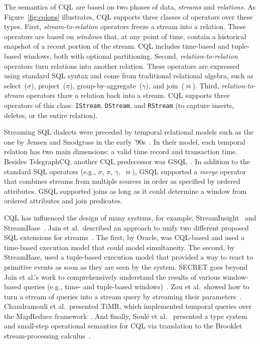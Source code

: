 The semantics of CQL are
based on two phases of data, \emph{streams} and \emph{relations}.
As Figure~\ref{fig:cqlops} illustrates, CQL
supports three classes of operators over these types. First,
\emph{stream-to-relation} operators freeze a stream into a relation.
These operators are based on
\emph{windows} that, at any point of time, contain a
historical snapshot of a recent portion of the stream. CQL includes
time-based and tuple-based windows, both with optional
partitioning. Second, \emph{relation-to-relation} operators
turn relations into another relation. These operators are expressed
using standard SQL syntax and come from traditional relational
algebra, such as select~($\sigma$), project~($\pi$),
group-by-aggregate~($\gamma$), and join~($\bowtie$).
Third, \emph{rela\-tion-to-stream} operators thaw a relation
back into a stream. CQL supports three operators of this class:
\texttt{IStream}, \texttt{DStream}, and \texttt{RStream} (to capture inserts, deletes, or the entire
relation).

Streaming SQL dialects were preceded by temporal relational models
such as the one by Jensen and Snodgrass in the early
'90s~\cite{jensen1994temporal}. In their model, each temporal relation
has two main dimensions: a valid time record and transaction time.
Besides TelegraphCQ, another CQL predecessor was
\textsf{GSQL}~\cite{cranor_et_al_2003}.  In addition to the standard SQL
operators (e.g., $\sigma$, $\pi$, $\gamma$,~$\bowtie$), GSQL supported
a \emph{merge} operator that combines streams from multiple sources in
order as specified by ordered attributes.  GSQL supported joins as long
as it could determine a window from ordered attributes and join predicates.

CQL has influenced the design of many systems, for example,
\textsf{StreamInsight}~\cite{ali_et_al_2009} and
\textsf{StreamBase}~\cite{seyfer_tibbetts_mishkin_2011}.
%
Jain et al.\ described an approach to unify two different proposed SQL
extensions for streams~\cite{jain_et_al_2008}. The first, by
Oracle, was CQL-based and used a time-based execution model that
could model simultaneity. The second, by
StreamBase, used a tuple-based execution model that provided
a way to react to primitive events as soon as they are seen by the
system.
%
\textsf{SECRET} goes beyond Jain et al.'s work to comprehensively
understand the results of various window-based queries (e.g., time-
and tuple-based windows)~\cite{botan_et_al_2010}.
Zou et al.\ showed how to turn a stream of queries into a stream query
by streaming their parameters~\cite{zou_et_al_2010}.
%
Chandramouli et al.\ presented \textsf{TiMR}, which implemented
temporal queries over the MapReduce
framework~\cite{chandramouli2012temporal}.
%
And finally, Soul\'{e} et al.~\cite{soule_et_al_2016} presented a
type system and small-step operational semantics for CQL via
translation to the \textsf{Brooklet} stream-processing
calculus~\cite{soule_et_al_2010}.
